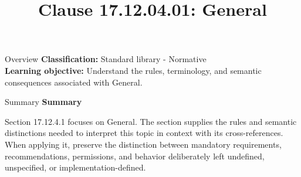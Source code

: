 \documentclass[10pt,letterpaper]{article}
\title{Clause 17.12.04.01: General}
\author{}
\date{}
\begin{document}
\maketitle
\begin{CornellOverviewBox}{Overview}
\textbf{Classification:} Standard library - Normative\\[2pt]
\textbf{Learning objective:} Understand the rules, terminology, and semantic consequences associated with General.
\end{CornellOverviewBox}\begin{CornellSummaryBox}{Summary}
{\sffamily\bfseries\color{Accent} Summary}\par\vspace{3pt}Section 17.12.4.1 focuses on General. The section supplies the rules and semantic distinctions needed to interpret this topic in context with its cross-references. When applying it, preserve the distinction between mandatory requirements, recommendations, permissions, and behavior deliberately left undefined, unspecified, or implementation-defined.
\end{CornellSummaryBox}
\end{document}
